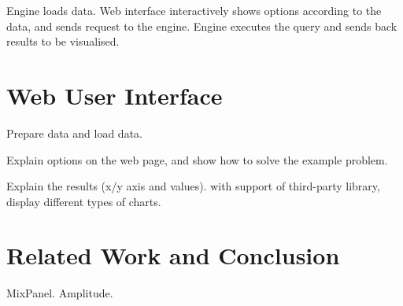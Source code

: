 \documentclass[10pt,conference,letterpaper]{IEEEtran}
\begin{document}
Engine loads data. Web interface interactively shows options according to the data, and sends request to the engine. Engine executes the query and sends back results to be visualised.

\section{Web User Interface}

Prepare data and load data.

Explain options on the web page, and show how to solve the example problem.

Explain the results (x/y axis and values). with support of third-party library, display different types of charts.

\section{Related Work and Conclusion}

MixPanel. Amplitude. 







\end{document}
